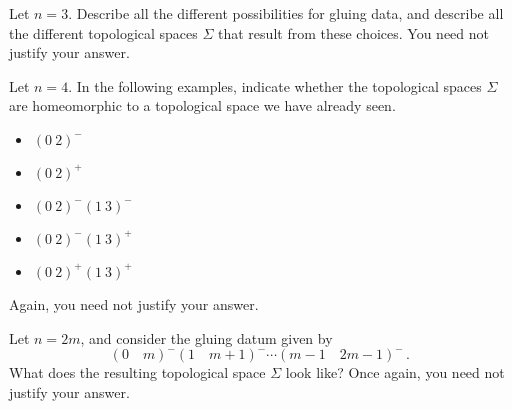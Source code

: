 \documentclass[a4paper,twoside,nols,nobib]{tufte-handout}
\begin{document}

\begin{Problem}
	\noindent
	Let $n=3$.
	Describe all the different possibilities for gluing data, and describe all the different topological spaces $\Sigma$ that result from these choices.
	You need not justify your answer.
\end{Problem}


\begin{Problem}
	\noindent
	Let $n = 4$.
	In the following examples, indicate whether the topological spaces $\Sigma$ are homeomorphic to a topological space we have already seen.
	\begin{itemize}
		\item $(0\ 2)^-$
		\item $(0\ 2)^+$
		\item $(0\ 2)^- (1\ 3)^-$
		\item $(0\ 2)^- (1\ 3)^+$
		\item $(0\ 2)^+ (1\ 3)^+$
	\end{itemize}
	Again, you need not justify your answer.
\end{Problem}


\begin{Problem}
	Let $n = 2m$, and consider the gluing datum given by
	\[
		(0\quad m)^- (1\quad m+1)^- \cdots (m-1\quad 2m-1)^- \period
	\]
	What does the resulting topological space $\Sigma$ look like?
	Once again, you need not justify your answer.
\end{Problem}

\end{document}

